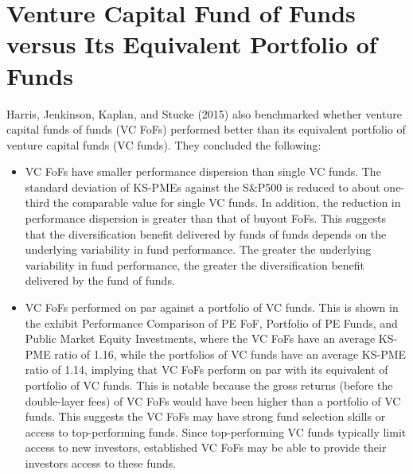 \documentclass[11pt]{article}
\begin{document}
\section*{Venture Capital Fund of Funds versus Its Equivalent Portfolio of Funds}
Harris, Jenkinson, Kaplan, and Stucke (2015) also benchmarked whether venture capital funds of funds (VC FoFs) performed better than its equivalent portfolio of venture capital funds (VC funds). They concluded the following:

\begin{itemize}
  \item VC FoFs have smaller performance dispersion than single VC funds. The standard deviation of KS-PMEs against the S\&P500 is reduced to about one-third the comparable value for single VC funds. In addition, the reduction in performance dispersion is greater than that of buyout FoFs. This suggests that the diversification benefit delivered by funds of funds depends on the underlying variability in fund performance. The greater the underlying variability in fund performance, the greater the diversification benefit delivered by the fund of funds.
  \item VC FoFs performed on par against a portfolio of VC funds. This is shown in the exhibit Performance Comparison of PE FoF, Portfolio of PE Funds, and Public Market Equity Investments, where the VC FoFs have an average KS-PME ratio of 1.16, while the portfolios of VC funds have an average KS-PME ratio of 1.14, implying that VC FoFs perform on par with its equivalent of portfolio of VC funds. This is notable because the gross returns (before the double-layer fees) of VC FoFs would have been higher than a portfolio of VC funds. This suggests the VC FoFs may have strong fund selection skills or access to top-performing funds. Since top-performing VC funds typically limit access to new investors, established VC FoFs may be able to provide their investors access to these funds.
\end{itemize}
\end{document}
